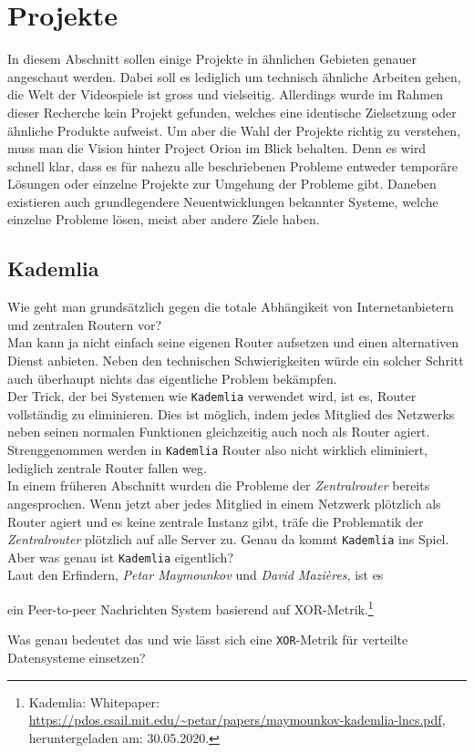 \documentclass[a4paper,11pt,titlepage,twoside]{memoir}
\begin{document}
\section{Projekte}
\label{sec:org1d9a1f0}
In diesem Abschnitt sollen einige Projekte in ähnlichen Gebieten
genauer angeschaut werden. Dabei soll es lediglich um technisch
ähnliche Arbeiten gehen, die Welt der Videospiele ist gross und
vielseitig. Allerdings wurde im Rahmen dieser Recherche kein Projekt
gefunden, welches eine identische Zielsetzung oder ähnliche Produkte
aufweist. Um aber die Wahl der Projekte richtig zu verstehen, muss man
die Vision hinter Project Orion im Blick behalten. Denn es wird
schnell klar, dass es für nahezu alle beschriebenen Probleme entweder
temporäre Lösungen oder einzelne Projekte zur Umgehung der Probleme
gibt. Daneben existieren auch grundlegendere Neuentwicklungen
bekannter Systeme, welche einzelne Probleme lösen, meist aber andere
Ziele haben.\\
\subsection{Kademlia}
\label{sec:orgd8b2ed6}
Wie geht man grundsätzlich gegen die totale Abhängikeit von
Internetanbietern und zentralen Routern vor?\\
Man kann ja nicht einfach seine eigenen Router aufsetzen und einen
alternativen Dienst anbieten. Neben den technischen Schwierigkeiten
würde ein solcher Schritt auch überhaupt nichts das eigentliche
Problem bekämpfen.\\

\noindent Der Trick, der bei Systemen wie \texttt{Kademlia} verwendet wird, ist
es, Router vollständig zu eliminieren. Dies ist möglich, indem jedes
Mitglied des Netzwerks neben seinen normalen Funktionen gleichzeitig
auch noch als Router agiert. Strenggenommen werden in \texttt{Kademlia} Router
also nicht wirklich eliminiert, lediglich zentrale Router fallen
weg.\\

\noindent In einem früheren Abschnitt wurden die Probleme der
\emph{Zentralrouter} bereits angesprochen. Wenn jetzt aber jedes Mitglied in
einem Netzwerk plötzlich als Router agiert und es keine zentrale
Instanz gibt, träfe die Problematik der \emph{Zentralrouter} plötzlich auf
alle Server zu. Genau da kommt \texttt{Kademlia} ins Spiel. Aber was genau ist
\texttt{Kademlia} eigentlich?\\

\noindent Laut den Erfindern, \emph{Petar Maymounkov} und \emph{David Mazières},
ist es
\begin{center}
ein Peer-to-peer Nachrichten System basierend auf XOR-Metrik.\footnote{Kademlia: Whitepaper:
\url{https://pdos.csail.mit.edu/\~petar/papers/maymounkov-kademlia-lncs.pdf},
heruntergeladen am: 30.05.2020.}
\end{center}
Was genau bedeutet das und wie lässt sich eine \texttt{XOR}-Metrik für
verteilte Datensysteme einsetzen?\\
\end{document}
